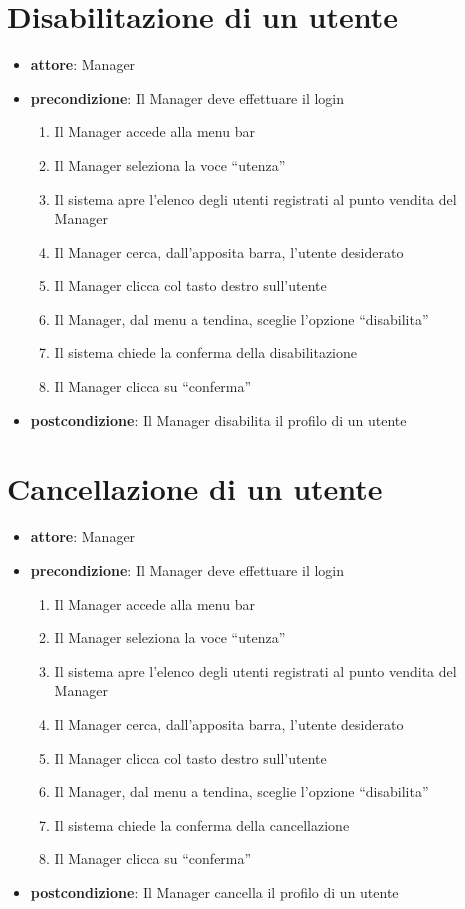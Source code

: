 \section{Disabilitazione di un utente}
\begin{itemize}
    \item \textbf{attore}: Manager
    \item \textbf{precondizione}: Il Manager deve effettuare il login
    
    \begin{enumerate}
        \item Il Manager accede alla menu bar
        \item Il Manager seleziona la voce “utenza”
        \item Il sistema apre l’elenco degli utenti registrati al punto vendita del Manager
        \item Il Manager cerca, dall’apposita barra, l’utente desiderato
        \item Il Manager clicca col tasto destro sull’utente
        \item Il Manager, dal menu a tendina, sceglie l’opzione “disabilita”
        \item Il sistema chiede la conferma della disabilitazione
        \item Il Manager clicca su “conferma”
    \end{enumerate}

    \item \textbf{postcondizione}: Il Manager disabilita il profilo di un utente
\end{itemize}


\section{Cancellazione di un utente}
\begin{itemize}
    \item \textbf{attore}: Manager
    \item \textbf{precondizione}: Il Manager deve effettuare il login
    
    \begin{enumerate}
        \item Il Manager accede alla menu bar
        \item Il Manager seleziona la voce “utenza”
        \item Il sistema apre l’elenco degli utenti registrati al punto vendita del Manager
        \item Il Manager cerca, dall’apposita barra, l’utente desiderato
        \item Il Manager clicca col tasto destro sull’utente
        \item Il Manager, dal menu a tendina, sceglie l’opzione “disabilita”
        \item Il sistema chiede la conferma della cancellazione
        \item Il Manager clicca su “conferma”
    \end{enumerate}

    \item \textbf{postcondizione}: Il Manager cancella il profilo di un utente
\end{itemize}


